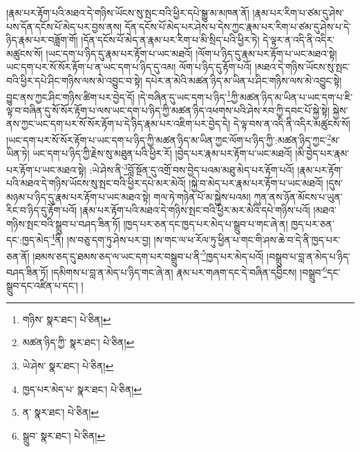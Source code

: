 །རྣམ་པར་རྟོག་པའི་མཐའ་དེ་གཉིས་ཡོངས་སུ་སྤང་བའི་ཕྱིར་དཔེ་སྒྱུ་མ་མཁན་ནོ། །རྣམ་པར་རིག་པ་ཙམ་དུ་ཤེས་པས་དོན་དངོས་པོ་མེད་པར་བྱས་ནས། དོན་དངོས་པོ་མེད་པར་ཤེས་པ་དེས་ཀྱང་རྣམ་པར་རིག་པ་ཙམ་དུ་ཤེས་པ་དེ་ཉིད་རྣམ་པར་བཟློག་གོ། །དོན་དངོས་པོ་མེད་ན་རྣམ་པར་རིག་པ་མི་སྲིད་པའི་ཕྱིར་ཏེ། དེ་ལྟར་ན་འདི་ནི་འདིར་མཚུངས་སོ། །ཡང་དག་པ་ཉིད་དུ་རྣམ་པར་རྟོག་པ་ཡང་མཐའོ། །ལོག་པ་ཉིད་དུ་རྣམ་པར་རྟོག་པ་ཡང་མཐའ་སྟེ། ཡང་དག་པར་སོ་སོར་རྟོག་པ་ན་ཡང་དག་པ་ཉིད་དུ་འམ། ལོག་པ་ཉིད་དུ་རྟོག་པའོ། །མཐའ་དེ་གཉིས་ཡོངས་སུ་སྤང་བའི་ཕྱིར་དཔེ་ཤིང་གཉིས་ལས་མེ་འབྱུང་བ་སྟེ། དཔེར་ན་མེའི་མཚན་ཉིད་མ་ཡིན་པ་ཤིང་གཉིས་ལས་མེ་འབྱུང་སྟེ། བྱུང་ནས་ཀྱང་ཤིང་གཉིས་ཚིག་པར་བྱེད་དོ། །དེ་བཞིན་དུ་ཡང་དག་པ་ཉིད་\footnote{གཉིས་  སྣར་ཐང་།  པེ་ཅིན། }ཀྱི་མཚན་ཉིད་མ་ཡིན་པ་ཡང་དག་པ་ཇི་ལྟ་བ་བཞིན་དུ་སོ་སོར་རྟོག་པ་ལས་ཡང་དག་པ་ཉིད་ཀྱི་མཚན་ཉིད་འཕགས་པའི་ཤེས་རབ་ཀྱི་དབང་པོ་སྐྱེ་སྟེ། སྐྱེས་ནས་ཀྱང་ཡང་དག་པར་སོ་སོར་རྟོག་པ་དེ་ཉིད་རྣམ་པར་འཇིག་པར་བྱེད་དེ། དེ་ལྟ་བས་ན་འདི་ནི་འདིར་མཚུངས་སོ། །ཡང་དག་པར་སོ་སོར་རྟོག་པ་ཡང་དག་པ་ཉིད་ཀྱི་མཚན་ཉིད་མ་ཡིན་ཀྱང་ལོག་པ་ཉིད་ཀྱི་:མཚན་ཉིད་ཀྱང་\footnote{མཚན་ཉིད་ཀྱི་  སྣར་ཐང་།  པེ་ཅིན། }མ་ཡིན་ཏེ། ཡང་དག་པ་ཉིད་ཀྱི་རྗེས་སུ་མཐུན་པའི་ཕྱིར་རོ། །བྱེད་པར་རྣམ་པར་རྟོག་པ་ཡང་མཐའོ། །མི་བྱེད་པར་རྣམ་པར་རྟོག་པ་ཡང་མཐའ་སྟེ། :ཡེ་ཤེས་ནི་\footnote{ཡེ་ཤེས་  སྣར་ཐང་།  པེ་ཅིན། }བློ་སྔོན་དུ་འགྲོ་བས་བྱེད་པའམ་མཐུ་མེད་པར་རྟོག་པའོ། །རྣམ་པར་རྟོག་པའི་མཐའ་དེ་གཉིས་ཡོངས་སུ་སྤང་བའི་ཕྱིར་དཔེ་མར་མེའོ། །སྐྱེ་བ་མེད་པར་རྣམ་པར་རྟོག་པ་ཡང་མཐའོ། །དུས་མཉམ་པ་ཉིད་དུ་རྣམ་པར་རྟོག་པ་ཡང་མཐའ་སྟེ། གལ་ཏེ་གཉེན་པོ་མ་སྐྱེས་པའམ། ཀུན་ནས་ཉོན་མོངས་པ་ཡུན་རིང་བ་ཉིད་དུ་རྟོག་པའོ། །རྣམ་པར་རྟོག་པའི་མཐའ་དེ་གཉིས་སྤང་བའི་ཕྱིར་མར་མེའི་དཔེ་གཉིས་པའོ། །མཐའ་གཉིས་སྤང་བའི་སྒྲུབ་པ་བཤད་ཟིན་ཏོ། །ཁྱད་པར་ཅན་དང་ཁྱད་པར་མེད་པ་སྒྲུབ་པ་གང་ཞེ་ན། ཁྱད་པར་ཅན་དང་:ཁྱད་མེད་\footnote{ཁྱད་པར་མེད་པ་  སྣར་ཐང་།  པེ་ཅིན། }ནི། །ས་བཅུ་དག་ཏུ་ཤེས་པར་བྱ། །ས་གང་ལ་ཕ་རོལ་ཏུ་ཕྱིན་པ་གང་གི་ཤས་ཆེ་བ་དེ་ནི་ཁྱད་པར་ཅན་ནོ། །ཐམས་ཅད་དུ་ཐམས་ཅད་ལ་ཡང་དག་པར་བསྒྲུབ་པ་ནི་\footnote{ན་  སྣར་ཐང་།  པེ་ཅིན། }ཁྱད་པར་མེད་པའོ། །བསྒྲུབ་པ་བླ་ན་མེད་པ་ཉིད་བཤད་ཟིན་ཏོ། །དམིགས་པ་བླ་ན་མེད་པ་ཉིད་གང་ཞེ་ན། རྣམ་པར་གཞག་དང་དེ་བཞིན་དབྱིངས། །བསྒྲུབ་\footnote{སྒྲུབ་  སྣར་ཐང་།  པེ་ཅིན། }དང་སྒྲུབ་དང་འཛིན་པ་དང་། །
